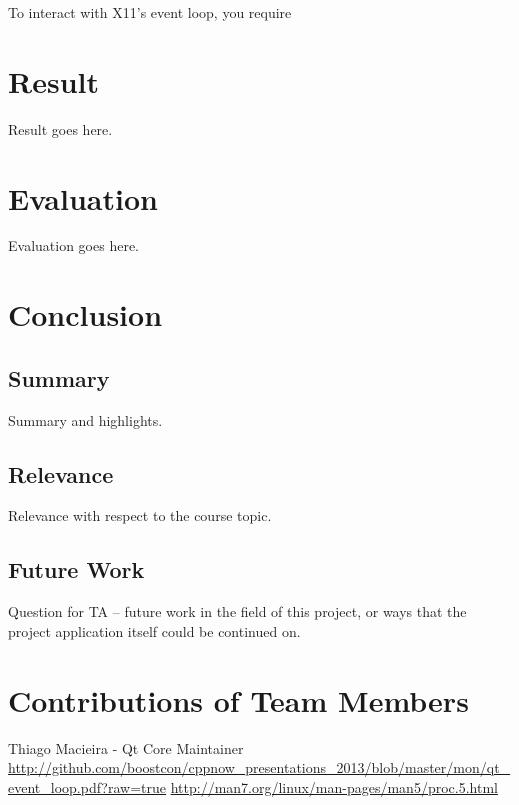 \documentclass[12pt]{article}
\begin{document}
To interact with X11's event loop, you require



	
	\section{Result}
	Result goes here.
	
	\section{Evaluation}
	Evaluation goes here.
	
	\section{Conclusion}
	
	\subsection{Summary}
	Summary and highlights.
	
	\subsection{Relevance}
	Relevance with respect to the course topic.
	
	\subsection{Future Work}
	Question for TA -- future work in the field of this project, or ways that the project application itself could be continued on.
	
	
	\setcounter{secnumdepth}{0}
	\section{Contributions of Team Members}
	
	\begin{thebibliography}{3}
	 Thiago Macieira - Qt Core Maintainer \url{http://github.com/boostcon/cppnow_presentations_2013/blob/master/mon/qt_event_loop.pdf?raw=true}
	\url{http://man7.org/linux/man-pages/man5/proc.5.html}
	\end{thebibliography}{}
\end{document}
